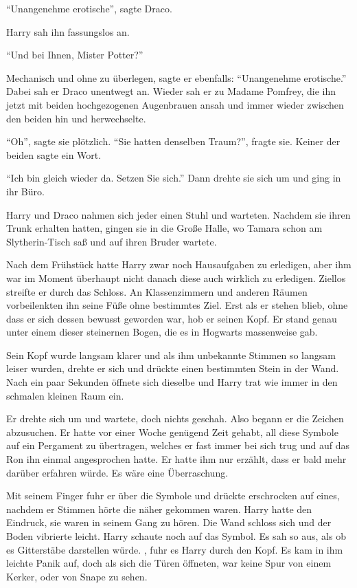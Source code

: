 \enquote{Unangenehme erotische}, sagte Draco.

Harry sah ihn fassungslos an.

\enquote{Und bei Ihnen, Mister Potter?}

Mechanisch und ohne zu überlegen, sagte er ebenfalls: \enquote{Unangenehme erotische.} Dabei sah er Draco unentwegt an. Wieder sah er zu Madame Pomfrey, die ihn jetzt mit beiden hochgezogenen Augenbrauen ansah und immer wieder zwischen den beiden hin und herwechselte.

\enquote{Oh}, sagte sie plötzlich. \enquote{Sie hatten denselben Traum?}, fragte sie. Keiner der beiden sagte ein Wort.

\enquote{Ich bin gleich wieder da. Setzen Sie sich.} Dann drehte sie sich um und ging in ihr Büro.

Harry und Draco nahmen sich jeder einen Stuhl und warteten. Nachdem sie ihren Trunk erhalten hatten, gingen sie in die Große Halle, wo Tamara schon am Slytherin-Tisch saß und auf ihren Bruder wartete.

Nach dem Frühstück hatte Harry zwar noch Hausaufgaben zu erledigen, aber ihm war im Moment überhaupt nicht danach diese auch wirklich zu erledigen. Ziellos streifte er durch das Schloss. An Klassenzimmern und anderen Räumen vorbeilenkten ihn seine Füße ohne bestimmtes Ziel. Erst als er stehen blieb, ohne dass er sich dessen bewusst geworden war, hob er seinen Kopf. Er stand genau unter einem dieser steinernen Bogen, die es in Hogwarts massenweise gab.

Sein Kopf wurde langsam klarer und als ihm unbekannte Stimmen so langsam leiser wurden, drehte er sich und drückte einen bestimmten Stein in der Wand. Nach ein paar Sekunden öffnete sich dieselbe und Harry trat wie immer in den schmalen kleinen Raum ein.

Er drehte sich um und wartete, doch nichts geschah. Also begann er die Zeichen abzusuchen. Er hatte vor einer Woche genügend Zeit gehabt, all diese Symbole auf ein Pergament zu übertragen, welches er fast immer bei sich trug und auf das Ron ihn einmal angesprochen hatte. Er hatte ihm nur erzählt, dass er bald mehr darüber erfahren würde. Es wäre eine Überraschung.

Mit seinem Finger fuhr er über die Symbole und drückte erschrocken auf eines, nachdem er Stimmen hörte die näher gekommen waren. Harry hatte den Eindruck, sie waren in seinem Gang zu hören. Die Wand schloss sich und der Boden vibrierte leicht. Harry schaute noch auf das Symbol. Es sah so aus, als ob es Gitterstäbe darstellen würde. , fuhr es Harry durch den Kopf. Es kam in ihm leichte Panik auf, doch als sich die Türen öffneten, war keine Spur von einem Kerker, oder von Snape zu sehen.

